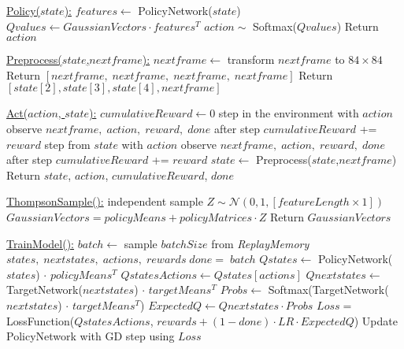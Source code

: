 \documentclass{article}
\begin{document}
\begin{algorithm}
    \begin{algorithmic}[2]

    \State \underline{Policy($state$):}
        \State $features \gets$ PolicyNetwork($state$)
        \State $Qvalues \gets GaussianVectors \cdot features^T$
        \State $action \sim$ Softmax($Qvalues$)
        \State Return $action$

    \State \underline{Preprocess($state$,$nextframe$):}
        \State $nextframe \gets$ transform $nextframe$ to $84\times84$
            \State Return $[nextframe,\;nextframe,\;nextframe,\;nextframe]$
        \Else
            \State Return $[state[2],state[3],state[4],nextframe]$
        \EndIf
    
    \State \underline{Act($action$, $state$):}
        \State $cumulativeReward \gets 0$
                \State step in the environment with $action$
                \State observe $nextframe,\;action,\;reward,\;done$ after step
                \State $cumulativeReward$ += $reward$
            \EndFor
            \State step from $state$ with $action$
            \State observe $nextframe,\;action,\;reward,\;done$ after step
            \State $cumulativeReward$ += $reward$
        \EndIf
        \State $state \gets$ Preprocess($state$,$nextframe$)
        \State Return $state$, $action$, $cumulativeReward$, $done$

    \State \underline{ThompsonSample():}
        \State independent sample $Z \sim \mathcal{N}(0,1, [featureLength\times1])$ 
        \State $GaussianVectors = policyMeans + policyMatrices \cdot Z$
        \State Return $GaussianVectors$

    \State \underline{TrainModel():}
        \State $batch \gets$ sample $batchSize$ from \textit{ReplayMemory}
        \State $states,\;nextstates,\;actions,\;rewards\;done = \; batch$
        \State $Qstates \gets$ PolicyNetwork($states$) $\cdot$ $policyMeans^T$
        \State $QstatesActions \gets Qstates[actions]$
        \State $Qnextstates \gets$ TargetNetwork($nextstates$) $\cdot$ $targetMeans^T$
        \State $Probs \gets$ Softmax(TargetNetwork($nextstates$) $\cdot$ $targetMeans^T$)
        \State $ExpectedQ \gets Qnextstates \cdot Probs$
        \State $Loss =$ LossFunction($QstatesActions$, $rewards + (1-done)\cdot LR \cdot ExpectedQ$)
        \State Update PolicyNetwork with GD step using $Loss$


\end{algorithmic}
\end{algorithm}
\end{document}
